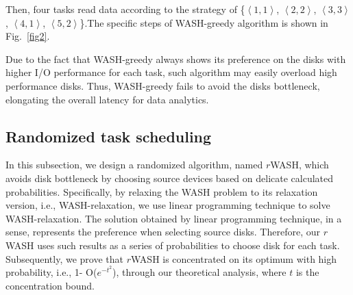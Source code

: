 \documentclass[conference]{IEEEtran}
\begin{document}
Then, four tasks read data according to the strategy of \{$\left \langle 1, 1\right \rangle$, $\left \langle 2, 2\right \rangle$,  $\left \langle 3, 3\right \rangle$, $\left \langle 4, 1\right \rangle$, $\left \langle 5, 2\right \rangle$\}.The specific steps of WASH-greedy algorithm is shown in Fig.~\ref{fig2}.

Due to the fact that WASH-greedy always shows its preference on the disks with higher I/O performance for each task, such algorithm may easily overload high performance disks. Thus, WASH-greedy fails to  avoid the disks bottleneck, elongating the overall latency for data analytics.

\subsection{Randomized task scheduling}\label{Randomized}


In this subsection, we design a randomized algorithm, named $r$WASH, which avoids disk bottleneck by choosing source devices based on delicate calculated probabilities. Specifically, by relaxing the WASH problem to its relaxation version, i.e., WASH-relaxation, we use linear programming technique to solve WASH-relaxation. The solution obtained by linear programming technique, in a sense, represents the preference when selecting source disks. Therefore, our $r$WASH  uses such results as a series of probabilities to choose disk for each task. Subsequently, we prove that $r$WASH is concentrated on its optimum with high probability, i.e., 1- O($e^{-t^2}$), through our theoretical analysis, where $t$ is the concentration bound.
\end{document}
